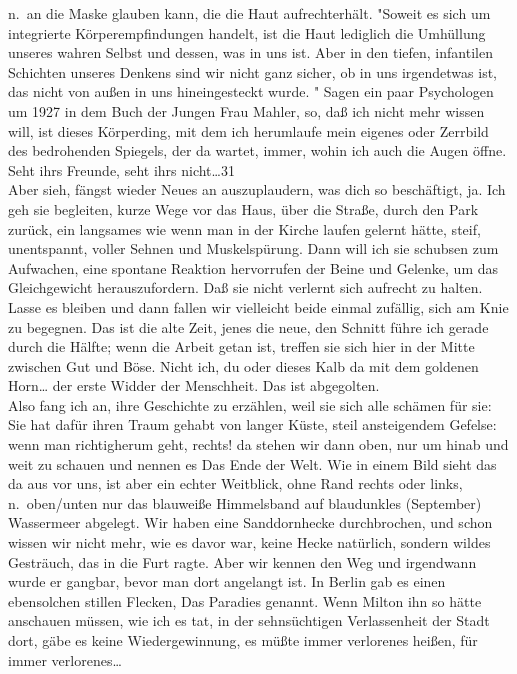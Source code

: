 \documentclass[
]{article}
\begin{document}
n.~an die Maske glauben kann, die die Haut aufrechterhält. "Soweit es
sich um integrierte Körperempfindungen handelt, ist die Haut lediglich
die Umhüllung unseres wahren Selbst und dessen, was in uns ist. Aber in
den tiefen, infantilen Schichten unseres Denkens sind wir nicht ganz
sicher, ob in uns irgendetwas ist, das nicht von außen in uns
hineingesteckt wurde.\textquotesingle{} " Sagen ein paar Psychologen um
1927 in dem Buch der Jungen Frau Mahler, so, daß ich nicht mehr wissen
will, ist dieses Körperding, mit dem ich herumlaufe mein eigenes oder
Zerrbild des bedrohenden Spiegels, der da wartet, immer, wohin ich auch
die Augen öffne. Seht ihrs Freunde, seht ihrs nicht\ldots{}31\\
Aber sieh, fängst wieder Neues an auszuplaudern, was dich so
beschäftigt, ja. Ich geh sie begleiten, kurze Wege vor das Haus, über
die Straße, durch den Park zurück, ein langsames wie wenn man in der
Kirche laufen gelernt hätte, steif, unentspannt, voller Sehnen und
Muskelspürung. Dann will ich sie schubsen zum Aufwachen, eine spontane
Reaktion hervorrufen der Beine und Gelenke, um das Gleichgewicht
herauszufordern. Daß sie nicht verlernt sich aufrecht zu halten. Lasse
es bleiben und dann fallen wir vielleicht beide einmal zufällig, sich am
Knie zu begegnen. Das ist die alte Zeit, jenes die neue, den Schnitt
führe ich gerade durch die Hälfte; wenn die Arbeit getan ist, treffen
sie sich hier in der Mitte zwischen Gut und Böse. Nicht ich, du oder
dieses Kalb da mit dem goldenen Horn\ldots{} der erste Widder der
Menschheit. Das ist abgegolten.\\
Also fang ich an, ihre Geschichte zu erzählen, weil sie sich alle
schämen für sie: Sie hat dafür ihren Traum gehabt von langer Küste,
steil ansteigendem Gefelse: wenn man richtigherum geht, rechts! da
stehen wir dann oben, nur um hinab und weit zu schauen und nennen es Das
Ende der Welt. Wie in einem Bild sieht das da aus vor uns, ist aber ein
echter Weitblick, ohne Rand rechts oder links, n.~oben/unten nur das
blauweiße Himmelsband auf blaudunkles (September) Wassermeer abgelegt.
Wir haben eine Sanddornhecke durchbrochen, und schon wissen wir nicht
mehr, wie es davor war, keine Hecke natürlich, sondern wildes Gesträuch,
das in die Furt ragte. Aber wir kennen den Weg und irgendwann wurde er
gangbar, bevor man dort angelangt ist. In Berlin gab es einen
ebensolchen stillen Flecken, Das Paradies genannt. Wenn Milton ihn so
hätte anschauen müssen, wie ich es tat, in der sehnsüchtigen
Verlassenheit der Stadt dort, gäbe es keine Wiedergewinnung, es müßte
immer verlorenes heißen, für immer verlorenes\ldots{}\\
\end{document}
